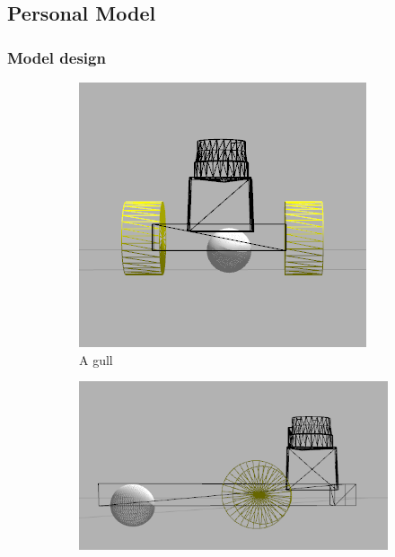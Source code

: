 \documentclass[10pt,journal,compsoc]{IEEEtran}
\begin{document}
\subsection{Personal Model}

\subsubsection{Model design}

\begin{figure}
    \centering
    \begin{subfigure}[b]{0.3\textwidth}
        \includegraphics[width=\textwidth]{robokoko-design-1}
        \caption{A gull}
        \label{fig:gull}
    \end{subfigure}
    \begin{subfigure}[b]{0.3\textwidth}
        \includegraphics[width=\textwidth]{robokoko-design-2}

\end{subfigure}
\end{figure}
\end{document}
